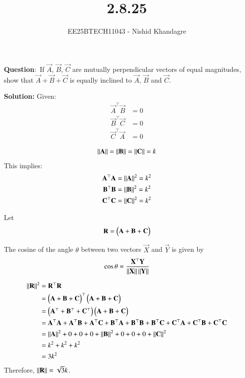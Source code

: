 \documentclass[journal]{IEEEtran}
\title{2.8.25}
\author{EE25BTECH11043 - Nishid Khandagre} %
\begin{document}
\maketitle

\renewcommand{\thefigure}{\theenumi}
\renewcommand{\thetable}{\theenumi}


\textbf{Question}:\
If $\vec{A}$, $\vec{B}$, $\vec{C}$ are mutually perpendicular vectors of equal magnitudes, show that $\vec{A} + \vec{B} + \vec{C}$ is equally inclined to $\vec{A}$, $\vec{B}$ and $\vec{C}$.

\textbf{Solution: }
Given:
    \begin{align}
    \vec{A}^\top \vec{B} &= 0 \\
    \vec{B}^\top \vec{C} &= 0 \\
    \vec{C}^\top \vec{A} &= 0
    \end{align}
    
    \begin{align}
    \left\lVert\mathbf{A}\right\rVert = \left\lVert\mathbf{B}\right\rVert = \left\lVert\mathbf{C}\right\rVert = k
    \end{align}
    This implies:
    \begin{align}
    \mathbf{A}^\top \mathbf{A} &= \left\lVert\mathbf{A}\right\rVert^2 = k^2 \\
    \mathbf{B}^\top \mathbf{B} &= \left\lVert\mathbf{B}\right\rVert^2 = k^2 \\
    \mathbf{C}^\top \mathbf{C} &= \left\lVert\mathbf{C}\right\rVert^2 = k^2
    \end{align}

Let 
\begin{align}
\mathbf{R} = \begin{pmatrix}\mathbf{A} + \mathbf{B} + \mathbf{C}\end{pmatrix}
\end{align}

The cosine of the angle $\theta$ between two vectors $\vec{X}$ and $\vec{Y}$ is given by 
\begin{align}
\cos \theta = \frac{\mathbf{X}^\top \mathbf{Y}}{\left\lVert\mathbf{X}\right\rVert\left\lVert\mathbf{Y}\right\rVert}
\label{eq:equation}
\end{align}

\begin{align}
\left\lVert\mathbf{R}\right\rVert^2 &= \mathbf{R}^\top \mathbf{R} \\
&= \begin{pmatrix}\mathbf{A} + \mathbf{B} + \mathbf{C}\end{pmatrix}^\top \begin{pmatrix}\mathbf{A} + \mathbf{B} + \mathbf{C}\end{pmatrix} \\
&= \begin{pmatrix}\mathbf{A}^\top + \mathbf{B}^\top + \mathbf{C}^\top\end{pmatrix} \begin{pmatrix}\mathbf{A} + \mathbf{B} + \mathbf{C}\end{pmatrix} \\
&= \mathbf{A}^\top \mathbf{A} + \mathbf{A}^\top \mathbf{B} + \mathbf{A}^\top \mathbf{C} + \mathbf{B}^\top \mathbf{A} + \mathbf{B}^\top \mathbf{B} + \mathbf{B}^\top \mathbf{C} + \mathbf{C}^\top \mathbf{A} + \mathbf{C}^\top \mathbf{B} + \mathbf{C}^\top \mathbf{C} \\
&= \left\lVert\mathbf{A}\right\rVert^2 + 0 + 0 + 0 + \left\lVert\mathbf{B}\right\rVert^2 + 0 + 0 + 0 + \left\lVert\mathbf{C}\right\rVert^2 \\
&= k^2 + k^2 + k^2 \\
&= 3k^2
\end{align}
Therefore, $\left\lVert\mathbf{R}\right\rVert = \sqrt{3}k$.
\end{document}
